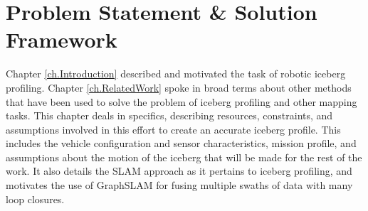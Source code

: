 
\chapter{Problem Statement \& Solution Framework}
\label{ch.ProblemStatement}

Chapter \ref{ch.Introduction}  described and motivated the task of robotic iceberg profiling. Chapter \ref{ch.RelatedWork} spoke in broad terms about other methods that have been used to solve the problem of iceberg profiling and other mapping tasks. This chapter deals in specifics, describing resources, constraints, and assumptions involved in this effort to create an accurate iceberg profile. This includes the vehicle configuration and sensor characteristics, mission profile, and assumptions about the motion of the iceberg that will be made for the rest of the work. It also details the SLAM approach as it pertains to iceberg profiling, and motivates the use of GraphSLAM for fusing multiple swaths of data with many loop closures. 


%
%
%

